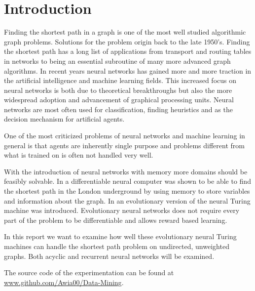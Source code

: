 
\section{Introduction}
Finding the shortest path in a graph is one of the most well studied algorithmic graph problems. Solutions for the problem origin back to the late 1950's. Finding the shortest path has a long list of applications from transport and routing tables in networks to being an essential subroutine of many more advanced graph algorithms. 
In recent years neural networks has gained more and more traction in the artificial intelligence and machine learning fields. This increased focus on neural networks is both due to theoretical breakthroughs but also the more widespread adoption and advancement of graphical processing units. Neural networks are most often used for classification, finding heuristics and as the decision mechanism for artificial agents.

\newpar One of the most criticized problems of neural networks and machine learning in general is that agents are inherently single purpose and problems different from what is trained on is often not handled very well.

\newpar With the introduction of neural networks with memory more domains should be feasibly solvable. In \cite{graves2016hybrid} a differentiable neural computer was shown to be able to find the shortest path in the London underground by using memory to store variables and information about the graph. In \cite{greve2016evolving} an evolutionary version of the neural Turing machine was introduced. Evolutionary neural networks does not require every part of the problem to be differentiable and allows reward based learning.

\newpar In this report we want to examine how well these evolutionary neural Turing machines can handle the shortest path problem on undirected, unweighted graphs. Both acyclic and recurrent neural networks will be examined.

\newpar The source code of the experimentation can be found at\\ \href{https://github.com/Awia00/Data-Mining/tree/master/Group%20Project/NeatBFS/src/NeatBFS}{www.github.com/Awia00/Data-Mining}.